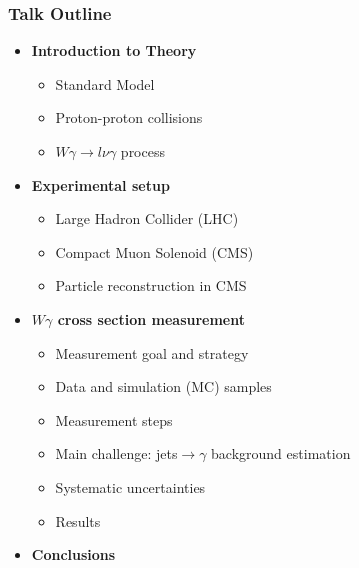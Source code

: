 \begin{frame}\frametitle{Talk Outline}
  \begin{itemize}
     \item {\scriptsize\bfseries{Introduction to Theory}}
       \begin{itemize}
          \tiny
          \item Standard Model
          \item Proton-proton collisions
          \item $W\gamma\rightarrow l\nu\gamma$ process
       \end{itemize}
     \item {\scriptsize\bfseries{Experimental setup}}
       \begin{itemize}
          \tiny
          \item Large Hadron Collider (LHC)
          \item Compact Muon Solenoid (CMS)
          \item Particle reconstruction in CMS
       \end{itemize}
     \item {\scriptsize\bfseries{$W\gamma$ cross section measurement}}
       \begin{itemize}
          \tiny
          \item Measurement goal and strategy 
          \item Data and simulation (MC) samples
          \item Measurement steps
          \item Main challenge: jets$\rightarrow\gamma$ background estimation
          \item Systematic uncertainties
          \item Results
       \end{itemize}
     \item {\scriptsize\bfseries{Conclusions}}
  \end{itemize}
\end{frame}%


